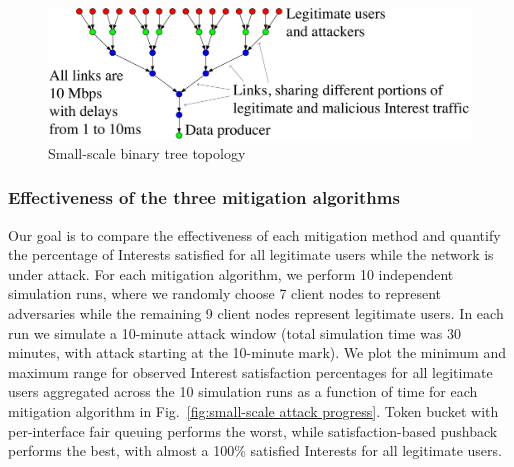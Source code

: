 \documentclass[10pt,conference]{IEEEtran}
\begin{document}
{\begin{figure}[t]
  \centering
  \includegraphics[scale=0.2]{topo-tree-evil-5-good-0-producer-gw}
  \caption{Small-scale binary tree topology}
  \label{fig:small-scale}
  \vspace{-0.3cm}
\end{figure}


\subsubsection{Effectiveness of the three mitigation algorithms}


Our goal is to compare the effectiveness of each mitigation method and quantify the percentage of Interests satisfied for all legitimate users while the network is under attack. For each mitigation algorithm, we perform 10 independent simulation runs, where we randomly choose 7 client nodes to represent adversaries while the remaining 9 client nodes represent legitimate users. In each run we simulate a 10-minute attack window (total simulation time was 30 minutes, with attack starting at the 10-minute mark). We plot the minimum and maximum range for observed Interest satisfaction percentages for all legitimate users aggregated across the 10 simulation runs as a function of time for each mitigation algorithm in Fig.~\ref{fig:small-scale attack progress}. Token bucket with per-interface fair queuing performs the worst, while satisfaction-based pushback performs the best, with almost a 100\%  satisfied Interests for all legitimate users.

}
\end{document}
